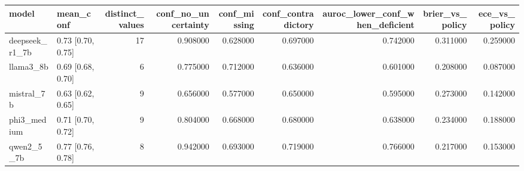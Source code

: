 \begin{tabular}{llrrrrrrr}
\toprule
model & mean\_conf & distinct\_values & conf\_no\_uncertainty & conf\_missing & conf\_contradictory & auroc\_lower\_conf\_when\_deficient & brier\_vs\_policy & ece\_vs\_policy \\
\midrule
deepseek\_r1\_7b & 0.73 [0.70, 0.75] & 17 & 0.908000 & 0.628000 & 0.697000 & 0.742000 & 0.311000 & 0.259000 \\
llama3\_8b & 0.69 [0.68, 0.70] & 6 & 0.775000 & 0.712000 & 0.636000 & 0.601000 & 0.208000 & 0.087000 \\
mistral\_7b & 0.63 [0.62, 0.65] & 9 & 0.656000 & 0.577000 & 0.650000 & 0.595000 & 0.273000 & 0.142000 \\
phi3\_medium & 0.71 [0.70, 0.72] & 9 & 0.804000 & 0.668000 & 0.680000 & 0.638000 & 0.234000 & 0.188000 \\
qwen2\_5\_7b & 0.77 [0.76, 0.78] & 8 & 0.942000 & 0.693000 & 0.719000 & 0.766000 & 0.217000 & 0.153000 \\
\bottomrule
\end{tabular}
